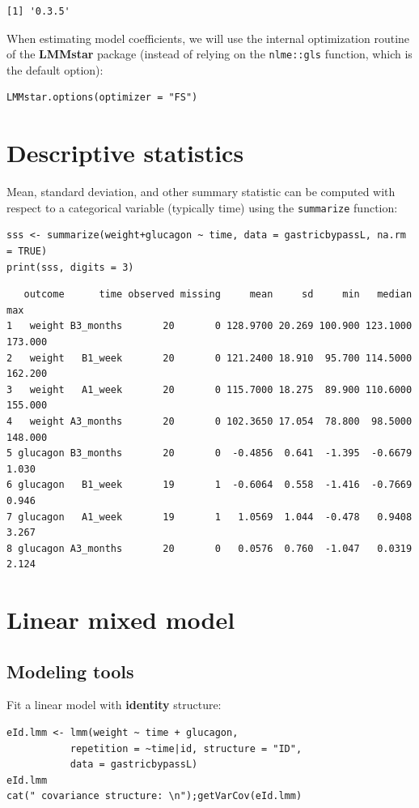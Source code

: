\documentclass[12pt]{article}
\begin{document}
\begin{verbatim}
[1] '0.3.5'
\end{verbatim}


When estimating model coefficients, we will use the internal
optimization routine of the \textbf{LMMstar} package (instead of relying on
the \texttt{nlme::gls} function, which is the default option):
\lstset{language=r,label= ,caption= ,captionpos=b,numbers=none}
\begin{lstlisting}
LMMstar.options(optimizer = "FS")
\end{lstlisting}

\clearpage

\section{Descriptive statistics}
\label{sec:org8ac86bc}
Mean, standard deviation, and other summary statistic can be computed
with respect to a categorical variable (typically time) using the
\texttt{summarize} function:
\lstset{language=r,label= ,caption= ,captionpos=b,numbers=none}
\begin{lstlisting}
sss <- summarize(weight+glucagon ~ time, data = gastricbypassL, na.rm = TRUE)
print(sss, digits = 3)
\end{lstlisting}

\begin{verbatim}
   outcome      time observed missing     mean     sd     min   median     max
1   weight B3_months       20       0 128.9700 20.269 100.900 123.1000 173.000
2   weight   B1_week       20       0 121.2400 18.910  95.700 114.5000 162.200
3   weight   A1_week       20       0 115.7000 18.275  89.900 110.6000 155.000
4   weight A3_months       20       0 102.3650 17.054  78.800  98.5000 148.000
5 glucagon B3_months       20       0  -0.4856  0.641  -1.395  -0.6679   1.030
6 glucagon   B1_week       19       1  -0.6064  0.558  -1.416  -0.7669   0.946
7 glucagon   A1_week       19       1   1.0569  1.044  -0.478   0.9408   3.267
8 glucagon A3_months       20       0   0.0576  0.760  -1.047   0.0319   2.124
\end{verbatim}


\clearpage

\section{Linear mixed model}
\label{sec:org40aeaab}
\subsection{Modeling tools}
\label{sec:orgf51d1c2}
Fit a linear model with \textbf{identity} structure:
\lstset{language=r,label= ,caption= ,captionpos=b,numbers=none}
\begin{lstlisting}
eId.lmm <- lmm(weight ~ time + glucagon,
	       repetition = ~time|id, structure = "ID",
	       data = gastricbypassL)
eId.lmm
cat(" covariance structure: \n");getVarCov(eId.lmm)
\end{lstlisting}
\end{document}

